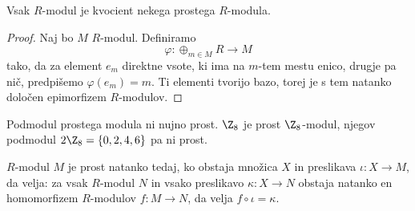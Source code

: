 
\begin{posledica}
  Vsak $R$-modul je kvocient nekega prostega $R$-modula.
\end{posledica}

\begin{proof}
  Naj bo $M$ $R$-modul.
  Definiramo
  \[
	\varphi: \oplus_{m \in M} R \to M
  \]
  tako, da za element $e_m$ direktne vsote, ki ima na $m$-tem mestu enico,
  drugje pa nič, predpišemo $\varphi(e_m) = m$.
  Ti elementi tvorijo bazo, torej je s tem natanko določen epimorfizem
  $R$-modulov.
\end{proof}


\begin{primer}
  Podmodul prostega modula ni nujno prost.
  $\Z_8$ je prost $\Z_8$-modul, njegov podmodul $2 \Z_8 = \{0, 2, 4, 6\}$ pa ni
  prost.
\end{primer}


\begin{izrek}
  $R$-modul $M$ je prost natanko tedaj, ko obstaja množica $X$ in preslikava
  $\iota: X \to M$, da velja: za vsak $R$-modul $N$ in vsako preslikavo $\kappa:
  X \to N$ obstaja natanko en homomorfizem $R$-modulov $f: M \to N$, da velja $f
  \circ \iota = \kappa$.
\end{izrek}

